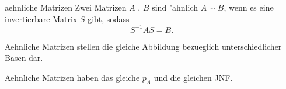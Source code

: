 \documentclass[class=article, crop=false]{standalone}
\begin{document}
\begin{zettel}{aehnliche Matrizen}
    Zwei Matrizen $A$ , $B$ sind "ahnlich $A \sim B$, wenn es eine invertierbare Matrix $S$ gibt, sodass
\[
    S^{-1} AS = B
.\]

Aehnliche Matrizen stellen die gleiche Abbildung bezueglich unterschiedlicher Basen dar.

Aehnliche Matrizen haben das gleiche $p_{A}$ und die gleichen JNF.
\end{zettel}
\end{document}
